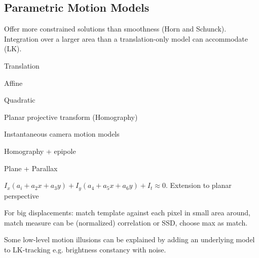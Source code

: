 \subsection{Parametric Motion Models}
Offer more constrained solutions than smoothness (Horn and Schunck). Integration over a larger area than a translation-only model can accommodate (LK).

\begin{definition}[2D Models]
  \begin{itemize*}
    \item Translation
    \item Affine
    \item Quadratic
    \item Planar projective transform (Homography)
  \end{itemize*}
\end{definition}

\begin{definition}[3D Models]
  \begin{itemize*}
    \item Instantaneous camera motion models
    \item Homography + epipole
    \item Plane + Parallax
  \end{itemize*}
\end{definition}

\begin{definition}
  \(I_x(a_i + a_2x + a_3y) + I_y(a_4 + a_5x +a_6y) + I_t \approx 0\).
  Extension to planar perspective
\end{definition}

\begin{definition}
  For big displacements: match template against each pixel in small area around, match measure can be (normalized) correlation or SSD, choose max as match.
\end{definition}

\begin{definition}
  Some low-level motion illusions can be explained by adding an underlying model to LK-tracking e.g. brightness constancy with noise.
\end{definition}
